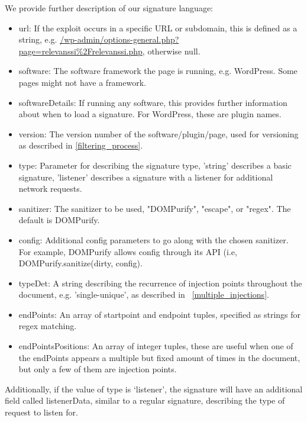 We provide further description of our signature language:
\begin{itemize}
	\item
	url: If the exploit occurs in a specific URL or subdomain, this is defined as a string, e.g.
	\url{/wp-admin/options-general.php?page=relevanssi\%2Frelevanssi.php}, otherwise null.
	\item
	software: The software framework the page is running, e.g. WordPress. Some pages
	might not have a framework.
	\item
	softwareDetails: If running any software, this provides further information about when to load a signature. For WordPress, these are plugin names.
	\item
	version: The version number of the software/plugin/page, used for versioning as described in \autoref{filtering_process}.
	\item 
	type: Parameter for describing the signature type, 'string' describes a basic signature, 'listener' describes a signature with a listener for additional network requests.
	\item 
	sanitizer: The sanitizer to be used, "DOMPurify", "escape", or "regex". The default is DOMPurify.
	\item
	config: Additional config parameters to go along with the chosen sanitizer. For example, DOMPurify allows config through its API (i.e, DOMPurify.sanitize(dirty, config).
	\item
	typeDet: A string describing the recurrence of injection points throughout the document, e.g. 'single-unique', as described in ~\autoref{multiple_injections}.
	\item
	endPoints: An array of startpoint and endpoint tuples, specified as strings for regex matching.
	\item 
	endPointsPositions: An array of integer tuples, these are useful when one of the endPoints appears a multiple but fixed amount of times in the document, but only a few of them are injection points.
\end{itemize}

Additionally, if the value of type is `listener', the signature will have an additional field called listenerData, similar to a regular signature, describing the type of request to listen for.
